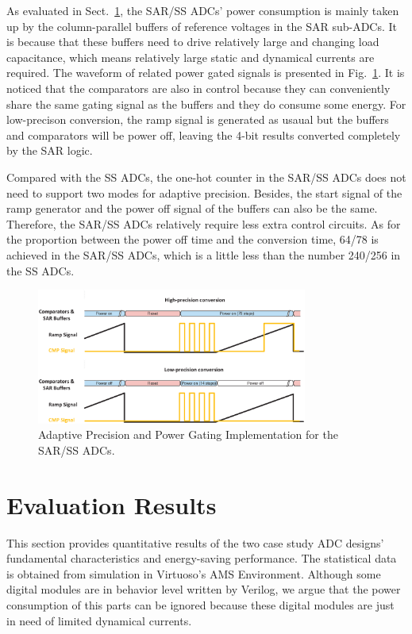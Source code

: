 \documentclass[conference]{IEEEtran}
\begin{document}
As evaluated in Sect.~\ref{result}, the SAR/SS ADCs’ power consumption is mainly taken up by the column-parallel buffers of reference voltages in the SAR sub-ADCs.
It is because that these buffers need to drive relatively large and changing load capacitance, which means relatively large static and dynamical currents are required.
The waveform of related power gated signals is presented in Fig.~\ref{SAR_pg}. It is noticed that the comparators are also in control because they can conveniently share the same gating signal 
as the buffers and they do consume some energy. For low-precison conversion, the ramp signal is generated as usaual but the buffers and comparators will be power off, 
leaving the 4-bit results converted completely by the SAR logic. 

Compared with the SS ADCs, the one-hot counter in the SAR/SS ADCs does not need to support two modes for adaptive precision. 
Besides, the start signal of the ramp generator and the power off signal of the buffers can also be the same. Therefore, the SAR/SS ADCs relatively require less extra control circuits.
As for the proportion between the power off time and the conversion time, 64/78 is achieved in the SAR/SS ADCs, which is a little less than the number 240/256 in the SS ADCs.

\begin{figure}[htbp]
	\centerline{\includegraphics[width=3.5in]{./Figures/SAR_pg.eps}}
	\caption{Adaptive Precision and Power Gating Implementation for the SAR/SS ADCs.}
	\label{SAR_pg}
\end{figure} 

\section{Evaluation Results}\label{result}

This section provides quantitative results of the two case study ADC designs’ fundamental characteristics and energy-saving performance. 
The statistical data is obtained from simulation in Virtuoso’s AMS Environment. 
Although some digital modules are in behavior level written by Verilog, we argue that the power consumption of this parts can be ignored 
because these digital modules are just in need of limited dynamical currents.
\end{document}
